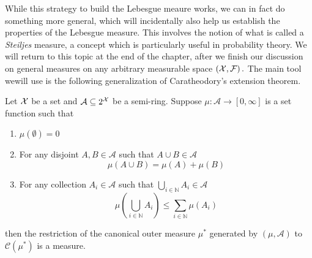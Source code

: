 While this strategy to build the Lebesgue meaure works, we can in
fact do something more general, which will incidentally also help
us establish the properties of the Lebesgue measure. This involves
the notion of what is called a \emph{Steiljes }measure, a concept
which is particularly useful in probability theory. We will return
to this topic at the end of the chapter, after we finish our discussion
on general measures on any arbitrary measurable space $\left(\mathcal{X},\mathcal{F}\right).$
The main tool wewill use is the following generalization of Caratheodory's
extension theorem.
\begin{thm}
\label{thm:semiRingCaratheodoryExtn}Let $\mathcal{X}$ be a set and $\mathcal{A}\subseteq2^{\mathcal{X}}$
be a semi-ring. Suppose $\mu:\mathcal{A}\longrightarrow\left[0,\infty\right]$
is a set function such that

\begin{enumerate}[label=(\roman*),leftmargin=.1\linewidth,rightmargin=.4\linewidth]
	\item $\mu\left(\emptyset\right) = 0 $
	\item  For any disjoint $A,B \in \mathcal{A}$ such that $A\cup B \in \mathcal{A}$
	\[
			\mu\left(A\cup B\right) = \mu\left(A\right) + \mu\left(B\right)
	\]
	\item For any collection $A_i \in \mathcal{A}$ such that $\bigcup_{i\in \mathds{N}} A_i \in \mathcal{A}$
	\[
		\mu\left(\bigcup_{i\in\mathds{N}} A_i \right) \leq \sum_{i \in \mathds{N}} \mu \left(A_i\right)
	\]
\end{enumerate}then the restriction of the canonical outer measure $\mu^{*}$ generated
by $\left(\mu,\mathcal{A}\right)$ to $\mathcal{C}\left(\mu^{*}\right)$
is a measure.
\end{thm}

